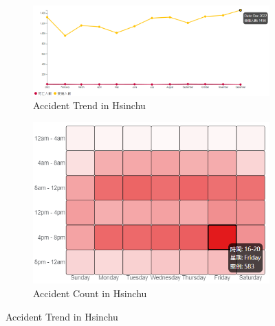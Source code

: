 \documentclass[a4paper, oneside, final, 12pt]{scrartcl} %
\begin{document}
\begin{figure}[htbp]
  \centering
  \begin{subfigure}[b]{0.6\textwidth}
      \includegraphics[width=\textwidth]{"./Image/western_line.png"}
      \caption{Accident Trend in Hsinchu}
      \label{fig: hsinchu_line}
  \end{subfigure}
  \begin{subfigure}[b]{0.35\textwidth}
      \includegraphics[width=\textwidth]{"./Image/western_heatmap.png"}
      \caption{Accident Count in Hsinchu}
      \label{fig: hsinchu_heatmap}
  \end{subfigure}
  \caption{Accident Trend in Hsinchu}
  \label{fig: hsinchu}
\end{figure}



\endgroup

\end{document}
